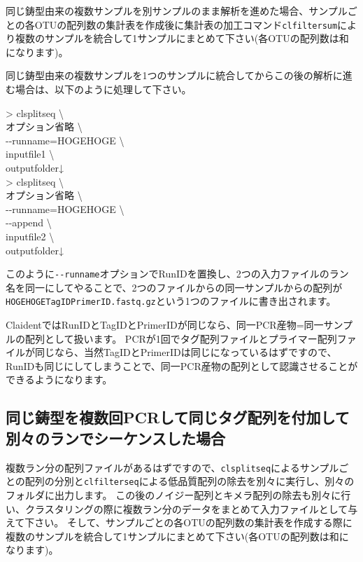 \documentclass[titlepage,10pt,a4paper,english]{jsbook}
\newenvironment{cmd}{\begin{oframed}\raggedright\ttfamily\footnotesize\setlength{\baselineskip}{1.4em}}{\end{oframed}\vspace{-1em}}
\begin{document}
同じ鋳型由来の複数サンプルを別サンプルのまま解析を進めた場合、サンプルごとの各OTUの配列数の集計表を作成後に集計表の加工コマンド\texttt{clfiltersum}により複数のサンプルを統合して1サンプルにまとめて下さい(各OTUの配列数は和になります)。

同じ鋳型由来の複数サンプルを1つのサンプルに統合してからこの後の解析に進む場合は、以下のように処理して下さい。
\begin{cmd}
{\textgreater} clsplitseq {\textbackslash}\\
オプション省略 {\textbackslash}\\
{-}{-}runname=HOGEHOGE {\textbackslash}\\
inputfile1 {\textbackslash}\\
outputfolder↓\\
{\textgreater} clsplitseq {\textbackslash}\\
オプション省略 {\textbackslash}\\
{-}{-}runname=HOGEHOGE {\textbackslash}\\
{-}{-}append {\textbackslash}\\
inputfile2 {\textbackslash}\\
outputfolder↓
\end{cmd}
このように\texttt{{-}{-}runname}オプションでRunIDを置換し、2つの入力ファイルのラン名を同一にしてやることで、2つのファイルからの同一サンプルからの配列が\texttt{HOGEHOGE{\textunderscore}{\textunderscore}TagID{\textunderscore}{\textunderscore}PrimerID.fastq.gz}という1つのファイルに書き出されます。

ClaidentではRunIDとTagIDとPrimerIDが同じなら、同一PCR産物=同一サンプルの配列として扱います。
PCRが1回でタグ配列ファイルとプライマー配列ファイルが同じなら、当然TagIDとPrimerIDは同じになっているはずですので、RunIDも同じにしてしまうことで、同一PCR産物の配列として認識させることができるようになります。

\subsection{同じ鋳型を複数回PCRして同じタグ配列を付加して別々のランでシーケンスした場合}

複数ラン分の配列ファイルがあるはずですので、\texttt{clsplitseq}によるサンプルごとの配列の分別と\texttt{clfilterseq}による低品質配列の除去を別々に実行し、別々のフォルダに出力します。
この後のノイジー配列とキメラ配列の除去も別々に行い、クラスタリングの際に複数ラン分のデータをまとめて入力ファイルとして与えて下さい。
そして、サンプルごとの各OTUの配列数の集計表を作成する際に複数のサンプルを統合して1サンプルにまとめて下さい(各OTUの配列数は和になります)。
\end{document}
